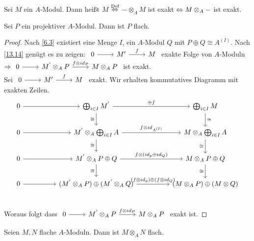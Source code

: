 \begin{df}
	Sei $M$ ein $A$-Modul. Dann heißt $M$   $\overset{\text{Def}}{\Leftrightarrow}$ $-\otimes_A M$ ist exakt $\Leftrightarrow M \otimes_A -$ ist exakt.
\end{df} 
\begin{bem} \label{13.18}
	Sei $P$ ein projektiver $A$-Modul. Dann ist $P$ flach. 
\end{bem}
\begin{proof}
	Nach \ref{6.3} existiert eine Menge $I$, ein $A$-Modul $Q$ mit $ P \oplus Q \cong A^{(I)}$. Nach \ref{13.14} genügt es zu zeigen: $\begin{tikzcd}
	0 \arrow{r} & M' \arrow{r}{f} & M \end{tikzcd}$ exakte Folge von $A$-Moduln $\Ra \begin{tikzcd}
	0 \arrow{r} & M^{'}\otimes_A P \arrow{r}{f \otimes id_P} & M \otimes_A P \end{tikzcd}$ ist exakt. \\
	Sei $\begin{tikzcd} 0 \arrow{r} & M' \arrow{r}{f} & M \end{tikzcd}$ exakt. Wir erhalten kommutatives Diagramm mit exakten Zeilen.
		$$\begin{tikzcd}[column sep = huge]
	0 \arrow{r} & \bigoplus_{i \in I} M^{'} \arrow[swap]{d}{\cong}\arrow{r}{\oplus f}& \bigoplus_{i \in I} M \arrow{d}{\cong} \\
	0 \arrow{r} & M^{'} \otimes_A \bigoplus_{i \in I} A \arrow[swap]{d}{\cong} \arrow{r}{ f \otimes id_{A^{(I)}}} & 	M \otimes_A \bigoplus_{i \in I} A \arrow[swap]{d}{\cong} \\
	0 \arrow{r} & M^{'} \otimes_A P \oplus Q \arrow[swap]{d}{\cong} \arrow{r}{ f \otimes (id_p \oplus id_Q) } & 	M \otimes_A P \oplus Q \arrow[swap]{d}{\cong}\\
	0 \arrow{r} & (M^{'} \otimes_A P) \oplus ( M^{'} \otimes_A Q) \arrow{r}{ (f \otimes id_p) \oplus (f \otimes id_Q) } & 	(M \otimes_A P) \oplus (M \otimes Q) \\
	\end{tikzcd}$$
	Woraus folgt dass $\begin{tikzcd}
	0 \arrow{r} & M^{'}\otimes_A P \arrow{r}{f \otimes id_P} & M \otimes_A P \end{tikzcd}$ exakt ist.
\end{proof}
\begin{bem} \label{13.19}
	Seien $M,N $ flache $A$-Moduln. Dann ist $ M \otimes_A N $ flach.
\end{bem}
